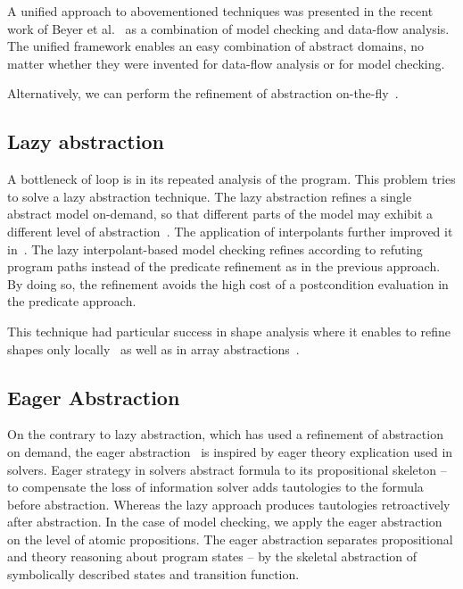 A unified approach to abovementioned techniques was presented in the recent
work of Beyer et al.~\cite{Beyer2018b} as a combination of model checking and
data-flow analysis. The unified framework enables an easy combination of
abstract domains, no matter whether they were invented for data-flow analysis
or for model checking.

Alternatively, we can perform the refinement of abstraction
on-the-fly~\cite{Beyer2008program}.

\subsection{Lazy abstraction}
\label{sec:lazya}

A bottleneck of \cegar loop is in its repeated analysis of the program. This
problem tries to solve a lazy abstraction technique. The lazy abstraction
refines a single abstract model on-demand, so that different parts of the model
may exhibit a different level of abstraction~\cite{Henzinger2002}. The application of
interpolants further improved it in~\cite{McMillan2006}. The lazy
interpolant-based model checking refines according to refuting program paths
instead of the predicate refinement as in the previous approach. By doing so,
the refinement avoids the high cost of a postcondition evaluation in the
predicate approach.

This technique had particular success in shape analysis where it enables to
refine shapes only locally~\cite{Henzinger2003,Beyer2006a} as well as in array
abstractions~\cite{Alberti2012, Alberti2012b}.

\subsection{Eager Abstraction}

On the contrary to lazy abstraction, which has used a refinement of abstraction
on demand, the eager abstraction~\cite{McMillan2018} is inspired by eager
theory explication used in \smt solvers. Eager strategy in \smt solvers
abstract formula to its propositional skeleton -- to compensate the loss of
information \smt solver adds tautologies to the formula before abstraction.
Whereas the lazy approach produces tautologies retroactively after abstraction.
In the case of model checking, we apply the eager abstraction on the level of
atomic propositions. The eager abstraction separates propositional and theory
reasoning about program states -- by the skeletal abstraction of symbolically
described states and transition function.

